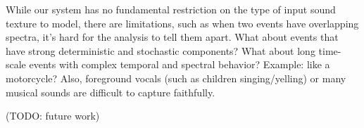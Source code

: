 \documentclass{acmsiggraph}               %
\begin{document}
While our system has no fundamental restriction on the type of input sound texture to model,
there are limitations, such as when two events have overlapping spectra, it's hard for the
analysis to tell them apart.  What about events that have strong deterministic and stochastic 
components?  What about long time-scale events with complex temporal and spectral behavior?
Example: like a motorcycle? Also, foreground vocals (such as children singing/yelling) or many 
musical sounds are difficult to capture faithfully.

(TODO: future work)


\nocite{*}

\end{document}
